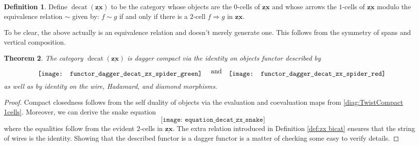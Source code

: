 \documentclass[11pt]{amsart}
\newtheorem{thm}{Theorem}[section]
\theoremstyle{definition}
\newtheorem{defn}[thm]{Definition}
\begin{document}
\begin{defn}
\label{def:decat zx}
	Define $\operatorname{decat}(\underline{\mathbf{zx}})$ to be the category whose objects are the $0$-cells of $\underline{\mathbf{zx}}$ and whose arrows the $1$-cells of $\underline{\mathbf{zx}}$ modulo the equivalence relation $\sim$ given by: $f \sim g$ if and only if there is a $2$-cell $f \Rightarrow g$ in $\underline{\mathbf{zx}}$.
\end{defn}

To be clear, the above actually is an equivalence relation and doesn't merely generate one.  This follows from the symmetry of spans and vertical composition.   

\begin{thm}
\label{thm:decat zx is dagger compact}
	The category $\operatorname{decat}(\underline{\mathbf{zx}})$ is dagger compact via the identity on objects functor described by 
	\[
	\raisebox{-0.5\height}{%
	\texttt{[image: functor\_dagger\_decat\_zx\_spider\_green]}
	}
	\quad \text{and} \quad
	\raisebox{-0.5\height}{%
	\texttt{[image: functor\_dagger\_decat\_zx\_spider\_red]}
	}
	\]
	as well as by identity on the wire, Hadamard, and diamond morphisms.
\end{thm}
\begin{proof}
	Compact closedness follows from the self duality of objects via the evaluation and coevaluation maps from \eqref{diag:TwistCompact 1cells}. Moreover, we can derive the snake equation
	\[
		\texttt{[image: equation\_decat\_zx\_snake]}
	\]
	where the equalities follow from the evident $2$-cells in $\underline{\mathbf{zx}}$. The extra relation introduced in Definition \ref{def:zx bicat} ensures that the string of wires is the identity.  Showing that the described functor is a dagger functor is a matter of checking some easy to verify details. 
\end{proof}
\end{document}
